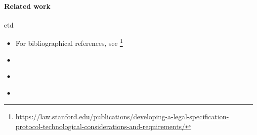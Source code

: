 \paragraph{Related work}
ctd


\begin{itemize}
\item For bibliographical references, see
  \footnote{\url{https://law.stanford.edu/publications/developing-a-legal-specification-protocol-technological-considerations-and-requirements/}}
\item \cite{sergot_kowalski_etal__british_nationality_acm_1986,kowalski_legislation_logic_programs_1995}
\item \cite{libal_steen_nai_suite_draft_reason_legal_texts_jurix_2019}
\item \cite{governatori_carnead_defeas_logic_icail_2011}
\end{itemize}



